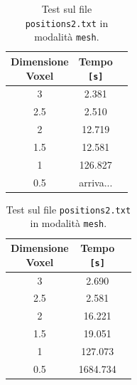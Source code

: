\begin{center}
\begin{table}[h]
    \begin{minipage}{.5\linewidth}
      \vspace{0pt}
      \begin{tabular}{ccc}
        \toprule
          \shortstack{Dimensione\\ Voxel} & \shortstack{Tempo \\\texttt{[s]}} \\
        \midrule
          3   & 2.381 \\
          2.5 & 2.510 \\
          2   & 12.719  \\
          1.5 & 12.581 \\
          1   & 126.827 \\
          0.5 & arriva... \\
        \bottomrule
      \end{tabular}
      \caption{Test sul file \texttt{positions2.txt} in modalità \texttt{box}.}
      \label{tab:positions2Box}
    \end{minipage}
    \begin{minipage}{.5\linewidth}
      \vspace{0pt}\raggedright
      \begin{tabular}{ccc}
        \toprule
          \shortstack{Dimensione\\ Voxel} & \shortstack{Tempo \\\texttt{[s]}}\\
        \midrule
          3   & 2.690 \\
          2.5 & 2.581 \\
          2   & 16.221 \\
          1.5 & 19.051 \\
          1   & 127.073 \\
          0.5 & 1684.734 \\
        \bottomrule
      \end{tabular}
      \caption{Test sul file \texttt{positions2.txt} in modalità \texttt{mesh}.}
      \label{tab:positions2Mesh}
    \end{minipage}
  \end{table}
\end{center}
